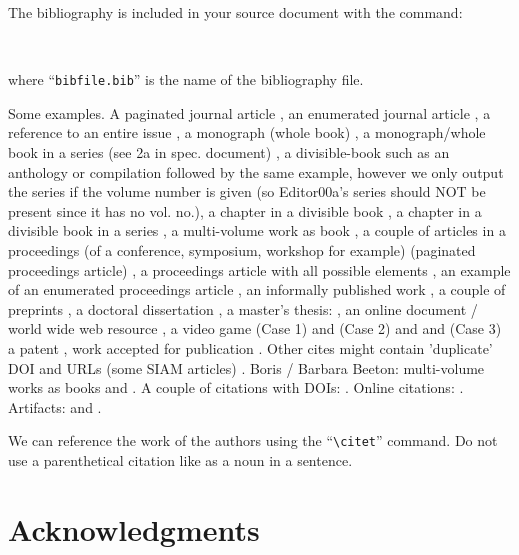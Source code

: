 \documentclass[manuscript, screen, review]{jair}
\begin{document}
The bibliography is included in your source document with the command:
\begin{verbatim}
    
\end{verbatim}
where ``\verb|bibfile.bib|'' is the name of the bibliography file.


  Some examples.  A paginated journal article \cite{Abril07}, an
  enumerated journal article \cite{Cohen07}, a reference to an entire
  issue \cite{JCohen96}, a monograph (whole book) \cite{Kosiur01}, a
  monograph/whole book in a series (see 2a in spec. document)
  \cite{Harel79}, a divisible-book such as an anthology or compilation
  \cite{Editor00} followed by the same example, however we only output
  the series if the volume number is given \cite{Editor00a} (so
  Editor00a's series should NOT be present since it has no vol. no.),
  a chapter in a divisible book \cite{Spector90}, a chapter in a
  divisible book in a series \cite{Douglass98}, a multi-volume work as
  book \cite{Knuth97}, a couple of articles in a proceedings (of a
  conference, symposium, workshop for example) (paginated proceedings
  article) \cite{Andler79, Hagerup1993}, a proceedings article with
  all possible elements \cite{Smith10}, an example of an enumerated
  proceedings article \cite{VanGundy07}, an informally published work
  \cite{Harel78}, a couple of preprints \cite{Bornmann2019,
    AnzarootPBM14}, a doctoral dissertation \cite{Clarkson85}, a
  master's thesis: \cite{anisi03}, an online document / world wide web
  resource \cite{Thornburg01, Ablamowicz07, Poker06}, a video game
  (Case 1) \cite{Obama08} and (Case 2) \cite{Novak03} and \cite{Lee05}
  and (Case 3) a patent \cite{JoeScientist001}, work accepted for
  publication \cite{rous08}. Other cites might
  contain 'duplicate' DOI and URLs (some SIAM articles)
  \cite{Kirschmer:2010:AEI:1958016.1958018}. Boris / Barbara Beeton:
  multi-volume works as books \cite{MR781536} and \cite{MR781537}. A
  couple of citations with DOIs:
  \cite{2004:ITE:1009386.1010128,Kirschmer:2010:AEI:1958016.1958018}. Online
  citations: \cite{TUGInstmem, Thornburg01, CTANacmart}.
  Artifacts: \cite{R} and \cite{UMassCitations}.

  We can reference the work of the authors \cite{Abril07} using the ``\verb|\citet|'' command. Do not use a parenthetical citation like \cite{Abril07} as a noun in a sentence.

\section{Acknowledgments}
\end{document}

